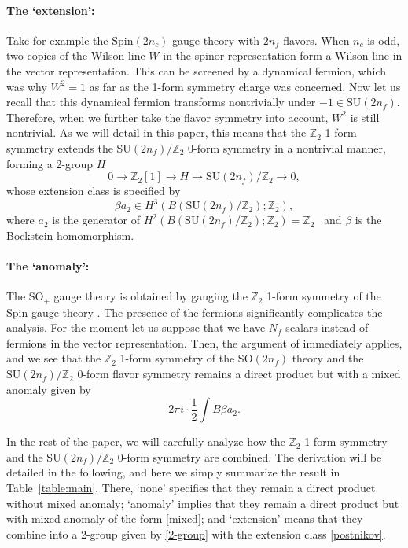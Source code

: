 \documentclass[12pt]{article}
\numberwithin{equation}{section}
\def\bZ{\mathbb{Z}}
\def\SU{\mathrm{SU}}
\def\SO{\mathrm{SO}}
\def\Spin{\mathrm{Spin}}
\begin{document}
\paragraph{The `extension':} 
Take for example the $\Spin(2n_c)$ gauge theory with $2n_f$ flavors.
When $n_c$ is odd,
two copies of the Wilson line $W$ in the spinor representation
form a Wilson line in the vector representation.
This can be screened by a dynamical fermion, which was why $W^2=1$ 
as far as the 1-form symmetry charge was concerned.
Now let us recall that this dynamical fermion transforms nontrivially under $-1\in \SU(2n_f)$.
Therefore, when we further take the flavor symmetry into account, $W^2$ is still nontrivial.
As we will detail in this paper,  this means that the $\bZ_2$ 1-form symmetry extends the $\SU(2n_f)/\bZ_2$ 0-form symmetry in a nontrivial manner, forming a 2-group $H$\begin{equation}
0\to \bZ_2[1] \to H\to \SU(2n_f)/\bZ_2\to 0,\label{2-group}
\end{equation}
whose extension class is specified by \begin{equation}
\beta a_2 \in H^3(B(\SU(2n_f)/\bZ_2);\bZ_2),\label{postnikov}
\end{equation}
where $a_2$ is the generator of $H^2(B(\SU(2n_f)/\bZ_2);\bZ_2)=\bZ_2$~\cite{KonoMimura1974}
and $\beta$ is the Bockstein homomorphism.

\paragraph{The `anomaly':} 
The $\SO_+$ gauge theory is obtained by gauging the $\bZ_2$ 1-form symmetry of the $\Spin$ gauge theory \cite{Kapustin:2014gua}.
The presence of the fermions significantly complicates the analysis.
For the moment let us suppose that we have $N_f$ scalars instead of fermions in the vector representation.
Then, the argument of \cite{Tachikawa:2017gyf} immediately applies, and 
we see that the $\bZ_2$ 1-form symmetry of the $\SO(2n_f)$ theory and the $\SU(2n_f)/\bZ_2$ 0-form flavor symmetry remains a direct product but with a mixed anomaly given by \begin{equation}
2\pi i \cdot \frac12 \int B\beta a_2.\label{mixed}
\end{equation}


In the rest of the paper, we will carefully analyze how the $\bZ_2$ 1-form symmetry and the $\SU(2n_f)/\bZ_2$ 0-form symmetry are combined.
The derivation will be detailed in the following, and here we simply summarize the result  in Table~\ref{table:main}.
There, `none' specifies that they remain a direct product without mixed anomaly;
`anomaly' implies that they remain a direct product but with mixed anomaly of the form \eqref{mixed};
and `extension' means that they combine into a 2-group given by \eqref{2-group} with the extension class \eqref{postnikov}.
\end{document}
